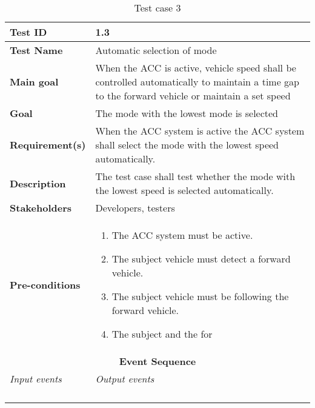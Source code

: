 \begin{table}[H]
\centering
\begin{tabularx}{\linewidth}{X|X}
  \hline
  \textbf{Test ID} & 1.3 \\
  \hline
  \textbf{Test Name} & Automatic selection of mode \\
  \hline
  \textbf{Main goal} & When the ACC is active, vehicle speed shall be controlled automatically to maintain a time gap to the forward vehicle or maintain a set speed  \\
  \hline
  \textbf{Goal} & The mode with the lowest mode is selected \\
  \hline
  \textbf{Requirement(s)} & When the ACC system is active the ACC system shall select the mode with the lowest speed automatically. \\
  \hline
  \textbf{Description} & The test case shall test whether the mode with the lowest speed is selected automatically.  \\
  \hline
  \textbf{Stakeholders} & Developers, testers \\
  \hline
  \textbf{Pre-conditions} & 
  \begin{enumerate}
      \item The ACC system must be active.
      \item The subject vehicle must detect a forward vehicle.
      \item The subject vehicle must be following the forward vehicle.
      \item The subject and the for
  \end{enumerate}
  \\
  \hline
  \multicolumn{2}{c}{\textbf{Event Sequence}} \\
  \hline
  \textit{Input events} & \textit{Output events} \\
  \hline
   &  \\
  \hline
   &  \\
  \hline
   &  \\
  \hline
   &  \\
  \hline
  \end{tabularx}
\caption{\label{tab_case3} Test case 3}
\end{table}



